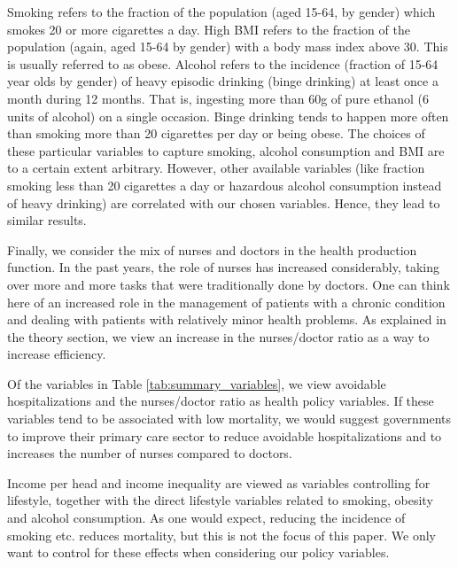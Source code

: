 \documentclass[a4paper,12pt]{article}
\begin{document}
Smoking refers to the fraction of the population (aged 15-64, by gender) which smokes 20 or more cigarettes a day. High BMI refers to the fraction of the population (again, aged 15-64 by gender) with a body mass index above 30. This is usually referred to as obese. Alcohol refers to the incidence (fraction of 15-64 year olds by gender) of heavy episodic drinking (binge drinking) at least once a month during 12 months. That is, ingesting more than 60g of pure ethanol (6 units of alcohol) on a single occasion. Binge drinking tends to happen more often than smoking more than 20 cigarettes per day or being obese. The choices of these particular variables to capture smoking, alcohol consumption and BMI are to a certain extent arbitrary. However, other available variables (like fraction smoking less than 20 cigarettes a day or hazardous alcohol consumption instead of heavy drinking) are correlated with our chosen variables. Hence, they lead to similar results.  

Finally, we consider the mix of nurses and doctors in the health production function. In the past years, the role of nurses has increased considerably, taking over more and more tasks that were traditionally done by doctors. One can think here of an increased role in the management of patients with a chronic condition and dealing with patients with relatively minor health problems. As explained in the theory section, we view an increase in the nurses/doctor ratio as a way to increase efficiency.

Of the variables in Table \ref{tab:summary_variables}, we view avoidable hospitalizations and the nurses/doctor ratio as health policy variables. If these variables tend to be associated with low mortality, we would suggest governments to improve their primary care sector to reduce avoidable hospitalizations and to increases the number of nurses compared to doctors.

Income per head and income inequality are viewed as variables controlling for lifestyle, together with the direct lifestyle variables related to smoking, obesity and alcohol consumption. As one would expect, reducing the incidence of smoking etc. reduces mortality, but this is not the focus of this paper. We only want to control for these effects when considering our policy variables.
\end{document}
